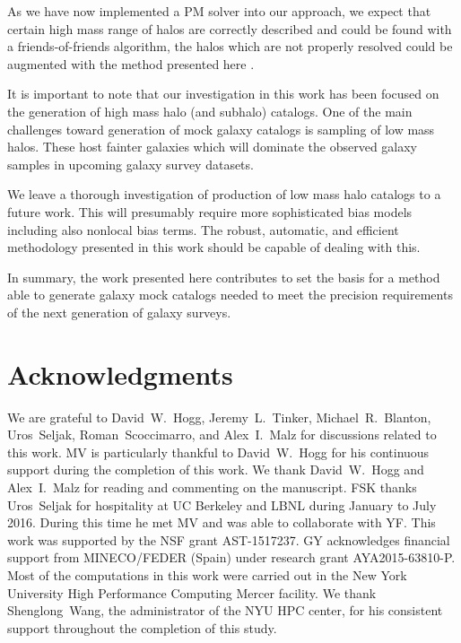 \documentclass[english,usenatbib]{mn2e}
\begin{document}

As we have now implemented a PM solver into our approach, we expect that certain high mass range of halos are correctly described and could be found with a friends-of-friends algorithm, the halos which are not properly resolved could be augmented with the method presented here  \citep[see methods to extend the resolution of $N$-body simulations,][]{delatorre,angulo2014,ahn2015}.  

It is important to note that our investigation in this work has been focused on the generation of high mass halo (and subhalo) catalogs. One of the main challenges toward generation of mock galaxy catalogs is sampling of low mass halos. These host fainter galaxies which will dominate the observed galaxy samples in upcoming galaxy survey datasets. 

We leave a thorough investigation of production of low mass halo catalogs to a future work. This will presumably require more sophisticated bias models including also nonlocal bias terms. The robust, automatic, and efficient methodology presented in this work should be capable of dealing with this.


In summary, the work presented here contributes to set the basis for a method able to generate galaxy mock catalogs needed to meet the precision requirements of the next generation of galaxy surveys. 


\section*{Acknowledgments}

We are grateful to David~W.~Hogg, Jeremy~L.~Tinker, Michael~R.~Blanton, Uros~Seljak, Roman~Scoccimarro, and Alex~I.~Malz for discussions related to this work.
MV is particularly thankful to David~W.~Hogg for his continuous support during the completion of this work. We thank David~W.~Hogg and Alex~I.~Malz for reading and commenting on the manuscript.
FSK thanks Uros~Seljak for hospitality at UC Berkeley and LBNL during January to July 2016. During this time he met MV and was able to collaborate with YF.
This work was supported by the NSF grant AST-1517237. GY acknowledges financial support from MINECO/FEDER  (Spain) under research grant AYA2015-63810-P. Most of the computations in this work were carried out in the New York University High Performance Computing Mercer facility. We thank Shenglong~Wang, the administrator of the NYU HPC center, for his consistent support throughout the completion of this study.
\end{document}

